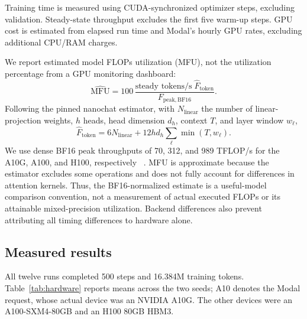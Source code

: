 \documentclass[11pt]{article}
\begin{document}
Training time is measured using CUDA-synchronized optimizer
steps, excluding validation. Steady-state throughput excludes
the first five warm-up steps. GPU cost is estimated from
elapsed run time and Modal's hourly GPU rates, excluding
additional CPU/RAM charges.


We report estimated model FLOPs utilization (MFU), not the utilization
percentage from a GPU monitoring dashboard:
\begin{equation}
\widehat{\mathrm{MFU}}=100\,
\frac{\text{steady tokens/s}\;\widehat F_{\mathrm{token}}}
{F_{\mathrm{peak,BF16}}}.
\end{equation}
Following the pinned nanochat estimator, with $N_{\mathrm{linear}}$ the
number of linear-projection weights, $h$ heads, head dimension $d_h$,
context $T$, and layer window $w_\ell$,
\begin{equation}
\widehat F_{\mathrm{token}} = 6N_{\mathrm{linear}}
 + 12h d_h\sum_{\ell}\min(T,w_\ell).
\end{equation}
We use dense BF16 peak throughputs of 70, 312, and
989 TFLOP/s for the A10G, A100, and H100, respectively
~\cite{nvidia-a10g,nvidia-a100,nvidia-peaks}.
MFU is approximate because the estimator excludes
some operations and does not fully account for
differences in attention kernels. Thus, the BF16-normalized estimate is a useful-model comparison
convention, not a measurement of actual executed FLOPs or its attainable
mixed-precision utilization. Backend differences also prevent attributing
all timing differences to hardware alone.

\subsection{Measured results}
All twelve runs completed 500 steps and 16.384M training tokens. Table~\ref{tab:hardware}
reports means across the two seeds; A10 denotes the Modal request, whose
actual device was an NVIDIA A10G. The other devices were an A100-SXM4-80GB
and an H100 80GB HBM3.
\begin{table}[htbp]
\centering
\small
{}
\caption{Part Three results}
\label{tab:hardware}
\end{table}
\end{document}
